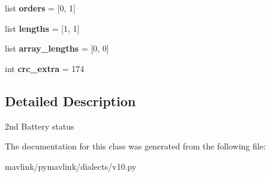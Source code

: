 \begin{DoxyCompactItemize}
\mbox{\label{classpymavlink_1_1dialects_1_1v10_1_1MAVLink__battery2__message_afb3bfea8e39ca5be32adcde35eef9fec}} 
list {\bfseries orders} = \mbox{[}0, 1\mbox{]}
\item 
\mbox{\label{classpymavlink_1_1dialects_1_1v10_1_1MAVLink__battery2__message_ade052cb59b607122d1d5d7bc5cd5f401}} 
list {\bfseries lengths} = \mbox{[}1, 1\mbox{]}
\item 
\mbox{\label{classpymavlink_1_1dialects_1_1v10_1_1MAVLink__battery2__message_a9dcce89357ac09529213aa4be02231c8}} 
list {\bfseries array\+\_\+lengths} = \mbox{[}0, 0\mbox{]}
\item 
\mbox{\label{classpymavlink_1_1dialects_1_1v10_1_1MAVLink__battery2__message_a5231830bce8592d0a4fffac430e725d8}} 
int {\bfseries crc\+\_\+extra} = 174
\end{DoxyCompactItemize}


\subsection{Detailed Description}
\begin{DoxyVerb}2nd Battery status
\end{DoxyVerb}
 

The documentation for this class was generated from the following file\+:\begin{DoxyCompactItemize}
\item 
mavlink/pymavlink/dialects/v10.\+py\end{DoxyCompactItemize}
